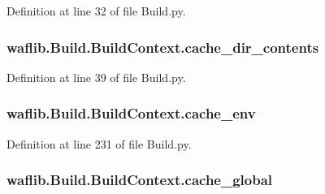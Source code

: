 Definition at line 32 of file Build.\+py.

\subsubsection[{\texorpdfstring{cache\+\_\+dir\+\_\+contents}{cache_dir_contents}}]{\setlength{\rightskip}{0pt plus 5cm}waflib.\+Build.\+Build\+Context.\+cache\+\_\+dir\+\_\+contents}\hypertarget{classwaflib_1_1_build_1_1_build_context_a9018ff10d597792e16549f40d3fef3e7}{}\label{classwaflib_1_1_build_1_1_build_context_a9018ff10d597792e16549f40d3fef3e7}


Definition at line 39 of file Build.\+py.

\subsubsection[{\texorpdfstring{cache\+\_\+env}{cache_env}}]{\setlength{\rightskip}{0pt plus 5cm}waflib.\+Build.\+Build\+Context.\+cache\+\_\+env}\hypertarget{classwaflib_1_1_build_1_1_build_context_aa766e747c3cc1331e2a6f766e49633c7}{}\label{classwaflib_1_1_build_1_1_build_context_aa766e747c3cc1331e2a6f766e49633c7}


Definition at line 231 of file Build.\+py.

\subsubsection[{\texorpdfstring{cache\+\_\+global}{cache_global}}]{\setlength{\rightskip}{0pt plus 5cm}waflib.\+Build.\+Build\+Context.\+cache\+\_\+global}\hypertarget{classwaflib_1_1_build_1_1_build_context_a20257acc8205f3c866b9f36091d64124}{}\label{classwaflib_1_1_build_1_1_build_context_a20257acc8205f3c866b9f36091d64124}


